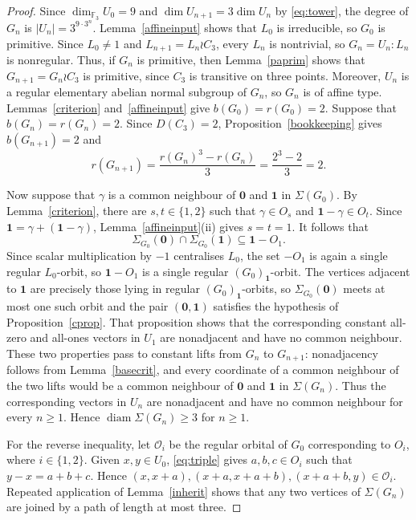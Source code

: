 \documentclass[10pt,a4paper]{amsart}
\newcommand\F{\mathbb{F}}
\newcommand\diam{\operatorname{diam}}
\begin{document}
\begin{proof}
Since $\dim_{\F_3}U_0=9$ and $\dim U_{n+1}=3\dim U_n$ by \eqref{eq:tower}, the degree of $G_n$ is $|U_n|=3^{9\cdot3^n}$. Lemma~\ref{affineinput} shows that $L_0$ is irreducible, so $G_0$ is primitive. Since $L_0\ne1$ and $L_{n+1}=L_n\wr C_3$, every $L_n$ is nontrivial, so $G_n=U_n{:}L_n$ is nonregular. Thus, if $G_n$ is primitive, then Lemma~\ref{paprim} shows that $G_{n+1}=G_n\wr C_3$ is primitive, since $C_3$ is transitive on three points. Moreover, $U_n$ is a regular elementary abelian normal subgroup of $G_n$, so $G_n$ is of affine type. Lemmas~\ref{criterion} and~\ref{affineinput} give $b(G_0)=r(G_0)=2$. Suppose that $b(G_n)=r(G_n)=2$. Since $D(C_3)=2$, Proposition~\ref{bookkeeping} gives $b(G_{n+1})=2$ and
\[
r(G_{n+1})=\frac{r(G_n)^3-r(G_n)}{3}=\frac{2^3-2}{3}=2.
\]

Now suppose that $\gamma$ is a common neighbour of $\mathbf0$ and $\mathbf1$ in $\Sigma(G_0)$. By Lemma~\ref{criterion}, there are $s,t\in\{1,2\}$ such that $\gamma\in O_s$ and $\mathbf1-\gamma\in O_t$. Since $\mathbf1=\gamma+(\mathbf1-\gamma)$, Lemma~\ref{affineinput}(ii) gives $s=t=1$. It follows that
\[
\Sigma_{G_0}(\mathbf0)\cap\Sigma_{G_0}(\mathbf1)\subseteq\mathbf1-O_1.
\]
Since scalar multiplication by $-1$ centralises $L_0$, the set $-O_1$ is again a single regular $L_0$-orbit, so $\mathbf1-O_1$ is a single regular $(G_0)_{\mathbf1}$-orbit. The vertices adjacent to $\mathbf1$ are precisely those lying in regular $(G_0)_{\mathbf1}$-orbits, so $\Sigma_{G_0}(\mathbf0)$ meets at most one such orbit and the pair $(\mathbf0,\mathbf1)$ satisfies the hypothesis of Proposition~\ref{cprop}. That proposition shows that the corresponding constant all-zero and all-ones vectors in $U_1$ are nonadjacent and have no common neighbour. These two properties pass to constant lifts from $G_n$ to $G_{n+1}$: nonadjacency follows from Lemma~\ref{basecrit}, and every coordinate of a common neighbour of the two lifts would be a common neighbour of $\mathbf0$ and $\mathbf1$ in $\Sigma(G_n)$. Thus the corresponding vectors in $U_n$ are nonadjacent and have no common neighbour for every $n\ge1$. Hence $\diam\Sigma(G_n)\ge3$ for $n\ge1$.

For the reverse inequality, let $\mathcal O_i$ be the regular orbital of $G_0$ corresponding to $O_i$, where $i\in\{1,2\}$. Given $x,y\in U_0$, \eqref{eq:triple} gives $a,b,c\in O_i$ such that $y-x=a+b+c$. Hence $(x,x+a),(x+a,x+a+b),(x+a+b,y)\in\mathcal O_i$. Repeated application of Lemma~\ref{inherit} shows that any two vertices of $\Sigma(G_n)$ are joined by a path of length at most three.
\end{proof}
\end{document}
